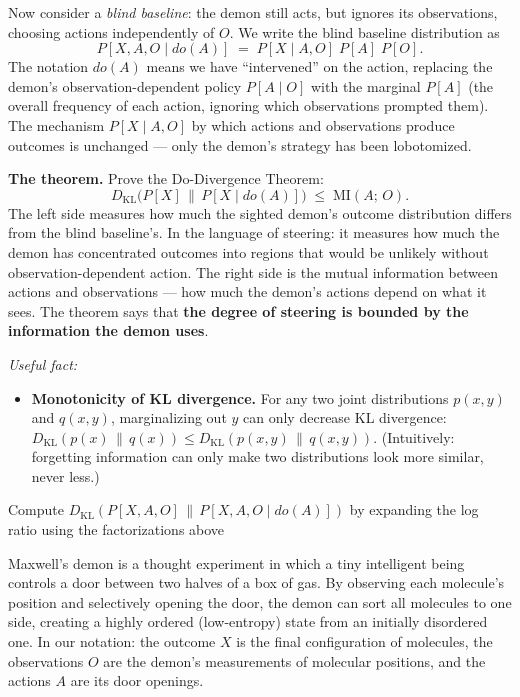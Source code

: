 \documentclass[11pt]{article}
\begin{document}
\begin{exercise}
\medskip
\noindent
Now consider a \emph{blind baseline}: the demon still acts, but ignores its
observations, choosing actions independently of $O$. We write the blind baseline
distribution as
\[
  P[X, A, O \mid do(A)] \;=\; P[X \mid A, O]\; P[A]\; P[O].
\]
The notation $do(A)$ means we have ``intervened'' on the action, replacing the
demon's observation-dependent policy $P[A \mid O]$ with the marginal $P[A]$ (the
overall frequency of each action, ignoring which observations prompted them). The
mechanism $P[X \mid A, O]$ by which actions and observations produce outcomes is
unchanged --- only the demon's strategy has been lobotomized.

\medskip
\noindent
\textbf{The theorem.} Prove the Do-Divergence Theorem:
\[
  D_{\mathrm{KL}}\bigl(P[X] \,\big\|\, P[X \mid do(A)]\bigr)
  \;\leq\; \mathrm{MI}(A;\, O).
\]
The left side measures how much the sighted demon's outcome distribution differs from
the blind baseline's. In the language of steering: it measures how much the demon has
concentrated outcomes into regions that would be unlikely without observation-dependent
action. The right side is the mutual information between actions and observations ---
how much the demon's actions depend on what it sees. The theorem says that \textbf{the
degree of steering is bounded by the information the demon uses}.

\medskip
\noindent
\emph{Useful fact:}
\begin{itemize}
  \item \textbf{Monotonicity of KL divergence.} For any two joint distributions
    $p(x,y)$ and $q(x,y)$, marginalizing out $y$ can only decrease KL divergence:
    $D_{\mathrm{KL}}(p(x) \,\|\, q(x)) \leq D_{\mathrm{KL}}(p(x,y) \,\|\, q(x,y))$.
    (Intuitively: forgetting information can only make two distributions look more
    similar, never less.)
\end{itemize}

\begin{hint}

Compute $D_{\mathrm{KL}}(P[X, A, O] \,\|\, P[X, A, O \mid do(A)])$
by expanding the log ratio using the factorizations above
\end{hint}

\begin{remark}
Maxwell's demon is a thought experiment in which a tiny intelligent being controls a
door between two halves of a box of gas. By observing each molecule's position and
selectively opening the door, the demon can sort all molecules to one side, creating a
highly ordered (low-entropy) state from an initially disordered one. In our notation:
the outcome $X$ is the final configuration of molecules, the observations $O$ are the
demon's measurements of molecular positions, and the actions $A$ are its door
openings.


\end{remark}
\end{exercise}
\end{document}
